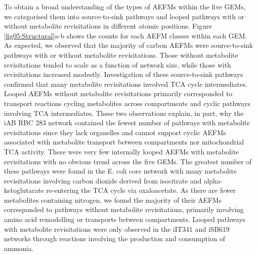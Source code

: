 \documentclass[12pt]{article}
\begin{document}
To obtain a broad understanding of the types of AEFMs within the five
GEMs, we categorised them into source-to-sink pathways and looped pathways
with or without metabolite revisitations in different atomic positions.
Figure \ref{fig05:Structural}a-b shows the counts for each AEFM classes
within each GEM. As expected, we observed that the majority of carbon
AEFMs were source-to-sink pathways with or without metabolite
revisitations. Those without metabolite revisitations tended to scale as
a function of network size, while those with revisitations increased
modestly. Investigation of these source-to-sink pathways confirmed that
many metabolite revisitations involved TCA cycle intermediates. Looped
AEFMs without metabolite revisitations primarily corresponded to transport
reactions cycling metabolites across compartments and cyclic pathways
involving TCA intermediates. These two observations explain, in part, why
the iAB RBC 283 network contained the fewest number of pathways with
metabolite revisitations since they lack organelles and cannot support
cyclic AEFMs associated with metabolite transport between compartments nor
mitochondrial TCA activity. There were very few internally looped AEFMs
with metabolite revisitations with no obvious trend across the five GEMs.
The greatest number of these pathways were found in the E. coli core
network with many metabolite revisitations involving carbon dioxide
derived from isocitrate and alpha-ketoglutarate re-entering the TCA cycle
via oxaloacetate. As there are fewer metabolites containing nitrogen, we
found the majority of their AEFMs corresponded to pathways without
metabolite revisitations, primarily involving amino acid remodelling or
transports between compartments. Looped pathways with metabolite
revisitations were only observed in the iIT341 and iSB619 networks through
reactions involving the production and consumption of ammonia. 
\end{document}
